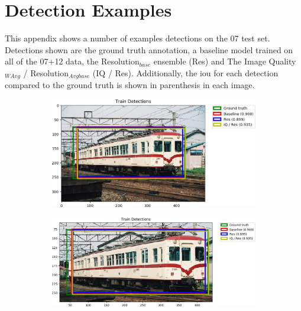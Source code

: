 \section{Detection Examples}\label{sec:detectionappendix}
This appendix shows a number of examples detections on the 07 test set. Detections shown are the ground truth annotation, a baseline model trained on all of the 07+12 data, the Resolution$_{base}$ ensemble (Res) and The Image Quality$_{WAvg}$ / Resolution$_{Avgbase}$ (IQ / Res). Additionally, the \gls{iou} for each detection compared to the ground truth is shown in parenthesis in each image.

\begin{figure}[H]
    \centering
    \begin{subfigure}[b]{0.45\textwidth}
        \center
        \includegraphics[width=\textwidth]{Figs/Results/000031_res.png}
        \caption{}\label{fig:}
    \end{subfigure}
    \begin{subfigure}[b]{0.45\textwidth}
        \center
        \includegraphics[width=\textwidth]{Figs/Results/000031_reszoom.png}
        \caption{}\label{fig:}
    \end{subfigure}
    \caption{}
    \label{fig:}
\end{figure} 



